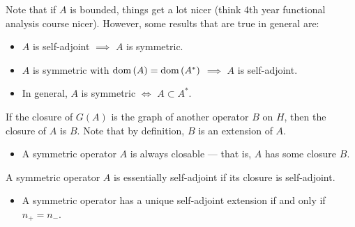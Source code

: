 \documentclass[11pt]{report}
\newcommand{\dom}[1]{\mathrm{dom}\bracs{#1}}
\begin{document}
Note that if $A$ is bounded, things get a lot nicer (think 4th year functional analysis course nicer).
However, some results that are true in general are:
\begin{itemize}
	\item $A$ is self-adjoint $\implies$ $A$ is symmetric.
	\item $A$ is symmetric with $\dom{A}=\dom{A^*}$ $\implies$ $A$ is self-adjoint.
	\item In general, $A$ is symmetric $\Leftrightarrow$ $A \subset A^*$.
\end{itemize}
\begin{definition}[Closure]
	If the closure of $G(A)$ is the graph of another operator $B$ on $H$, then the closure of $A$ is $B$.
	Note that by definition, $B$ is an extension of $A$.
\end{definition}
\begin{itemize}
	\item A symmetric operator $A$ is always closable --- that is, $A$ has some closure $B$.
\end{itemize}
\begin{definition}
	A symmetric operator $A$ is essentially self-adjoint if its closure is self-adjoint.
\end{definition}
\begin{itemize}
	\item A symmetric operator has a unique self-adjoint extension if and only if $n_+=n_-$.
\end{itemize}
\end{document}
